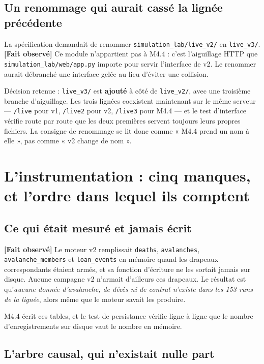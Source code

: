 \documentclass[11pt,a4paper]{article}
\newcommand{\code}[1]{\texttt{#1}}
\newcommand{\fait}{\textbf{[Fait observé]}}
\begin{document}
\subsection{Un renommage qui aurait cassé la lignée précédente}

La spécification demandait de renommer \code{simulation\_lab/live\_v2/} en
\code{live\_v3/}. \fait{} Ce module n'appartient pas à M4.4 : c'est
l'aiguillage HTTP que \code{simulation\_lab/web/app.py} importe pour servir
l'interface de v2. Le renommer aurait débranché une interface gelée au lieu
d'éviter une collision.

Décision retenue : \code{live\_v3/} est \textbf{ajouté} à côté de
\code{live\_v2/}, avec une troisième branche d'aiguillage. Les trois lignées
coexistent maintenant sur le même serveur --- \code{/live} pour v1,
\code{/live2} pour v2, \code{/live3} pour M4.4 --- et le test d'interface
vérifie route par route que les deux premières servent toujours leurs propres
fichiers. La consigne de renommage se lit donc comme « M4.4 prend un nom à
elle », pas comme « v2 change de nom ».

\section{L'instrumentation : cinq manques, et l'ordre dans lequel ils comptent}

\subsection{Ce qui était mesuré et jamais écrit}

\fait{} Le moteur v2 remplissait \code{deaths}, \code{avalanches},
\code{avalanche\_members} et \code{loan\_events} en mémoire quand les
drapeaux correspondants étaient armés, et sa fonction d'écriture ne les
sortait jamais sur disque. Aucune campagne v2 n'armait d'ailleurs ces
drapeaux. Le résultat est qu'\emph{aucune donnée d'avalanche, de décès ni de
contrat n'existe dans les 153 runs de la lignée}, alors même que le moteur
savait les produire.

M4.4 écrit ces tables, et le test de persistance vérifie ligne à ligne que le
nombre d'enregistrements sur disque vaut le nombre en mémoire.

\subsection{L'arbre causal, qui n'existait nulle part}
\end{document}
